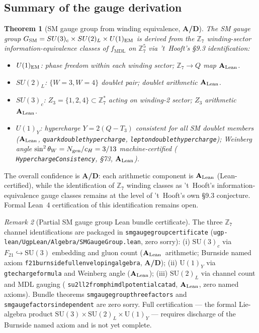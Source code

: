 \documentclass[11pt]{article}
\newtheorem{theorem}{Theorem}[section]
\theoremstyle{remark}
\newtheorem{remark}[theorem]{Remark}
\newcommand{\MDL}{\text{MDL}}
\newcommand{\lean}[1]{%
  \penalty-100
  \begingroup\def\_{\textunderscore\allowbreak}\texttt{#1}\endgroup}
\newcommand{\CatAL}{\ensuremath{\textbf{A}_{\rm Lean}}}
\newcommand{\CatAD}{\textbf{A/D}}
\begin{document}
\subsection{Summary of the gauge derivation}
\label{ssec:gauge_summary}

\begin{theorem}[SM gauge group from winding equivalence, \CatAD{}]
\label{thm:gauge}
The SM gauge group $G_{\rm SM} = SU(3)_c \times SU(2)_L \times
U(1)_{\rm EM}$ is derived from the $\mathbb{Z}_7$ winding-sector
information-equivalence classes of $f_{\MDL}$ on $\mathbb{Z}_7^5$
via 't~Hooft's \S9.3 identification:
\begin{itemize}[leftmargin=2em]
\item $U(1)_{\rm EM}$: phase freedom within each winding sector;
  $\mathbb{Z}_7\to Q$ map \CatAL{}.
\item $SU(2)_L$: $\{W=3,W=4\}$ doublet pair; doublet arithmetic \CatAL{}.
\item $SU(3)_c$: $Z_3=\{1,2,4\}\subset\mathbb{Z}_7^*$ acting on
  winding-2 sector; $Z_3$ arithmetic \CatAL{}.
\item $U(1)_Y$: hypercharge $Y=2(Q-T_3)$ consistent for all SM doublet
  members (\CatAL{}, \lean{quark\_doublet\_hypercharge},
  \lean{lepton\_doublet\_hypercharge}); Weinberg angle
  $\sin^2\theta_W = N_{\rm gen}/c_H = 3/13$ machine-certified
  (\lean{HyperchargeConsistency}, \S73, \CatAL{}).
\end{itemize}
\end{theorem}

The overall confidence is \CatAD{}: each arithmetic component is
\CatAL{} (Lean-certified), while the identification of $\mathbb{Z}_7$
winding classes as 't~Hooft's information-equivalence gauge classes
remains at the level of 't~Hooft's own \S9.3 conjecture.
Formal Lean~4 certification of this identification remains open.

\begin{remark}[Partial SM gauge group Lean bundle certificate]
The three $\mathbb{Z}_7$ channel identifications are packaged in
\lean{sm\_gauge\_group\_certificate} (\texttt{ugp-lean/UgpLean/Algebra/SMGaugeGroup.lean},
zero sorry): (i) $\mathrm{SU}(3)_c$ via $F_{21}\hookrightarrow\mathrm{SU}(3)$ embedding
and gluon count (\CatAL\ arithmetic; Burnside named axiom
\lean{f21\_burnside\_full\_enveloping\_algebra}, \CatAD);
(ii) $\mathrm{U}(1)_Y$ via \lean{gte\_charge\_formula} and Weinberg angle (\CatAL);
(iii) $\mathrm{SU}(2)_L$ via channel count and MDL gauging
(\lean{su2l\_l2\_from\_phimdl\_potential\_catad}, $\CatAL$, zero named axioms).
Bundle theorems \lean{sm\_gauge\_group\_three\_factors} and
\lean{sm\_gauge\_factors\_independent} are zero sorry.
Full certification --- the formal Lie-algebra product $\mathrm{SU}(3)\times\mathrm{SU}(2)_L\times\mathrm{U}(1)_Y$ --- requires discharge of the
Burnside named axiom and is not yet complete.
\end{remark}
\end{document}
